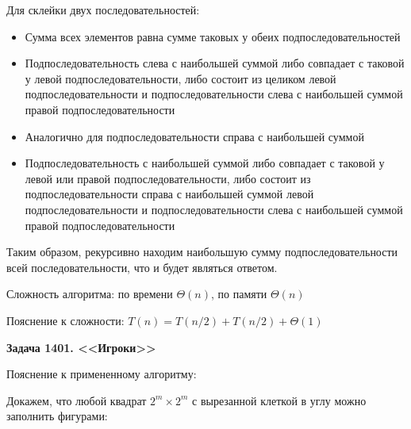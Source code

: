 \documentclass[12pt,a4paper]{article}
\begin{document}
    Для склейки двух последовательностей:
    \begin{itemize}
        \item Сумма всех элементов равна сумме таковых у обеих подпоследовательностей
        \item Подпоследовательность слева с наибольшей суммой либо совпадает с таковой у левой подпоследовательности,
        либо состоит из целиком левой подпоследовательности и подпоследовательности слева с наибольшей суммой правой подпоследовательности
        \item Аналогично для подпоследовательности справа с наибольшей суммой
        \item Подпоследовательность с наибольшей суммой либо совпадает с таковой у левой или правой подпоследовательности,
        либо состоит из подпоследовательности справа с наибольшей суммой левой подпоследовательности и подпоследовательности
        слева с наибольшей суммой правой подпоследовательности
    \end{itemize}

    Таким образом, рекурсивно находим наибольшую сумму подпоследовательности всей последовательности, что и будет
    являться ответом.

    Сложность алгоритма: по времени $\Theta(n)$, по памяти $\Theta(n)$

    Пояснение к сложности: $T(n)=T(n/2)+T(n/2)+\Theta(1)$

    \bigskip
    \textbf{Задача 1401. <<Игроки>>}

    Пояснение к примененному алгоритму:

    Докажем, что любой квадрат $2^m\times 2^m$ с вырезанной клеткой в углу можно заполнить фигурами:

    \bigskip

    \begin{center}
    \end{center}
\end{document}
